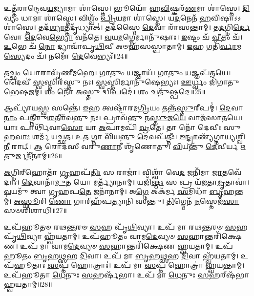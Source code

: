 𑌉𑌤𑍍𑌤᳴𑌰𑌾𑌨𑍍𑌦𑍇𑌵\-\ul{𑌯}\-𑌜𑍍𑌯𑌾𑌮𑌾 𑌶𑌾॑𑌸𑍍𑌤𑍇।
𑌭𑍂𑌯𑍋᳴ 𑌹\-\ul{𑌵𑌿}\-𑌷𑍍𑌕𑌰᳴\-\ul{𑌣}\-𑌮𑌾 𑌶𑌾॑𑌸𑍍𑌤𑍇।
\-\ul{𑌦𑌿}\-𑌵𑍍𑌯𑌂 𑌧𑌾𑌮𑌾 𑌶𑌾॑𑌸𑍍𑌤𑍇।
𑌵𑌿𑌶𑍍𑌵𑌂᳴ \ul{𑌪𑍍𑌰𑌿}\-𑌯𑌮𑌾 𑌶𑌾॑𑌸𑍍𑌤𑍇।
𑌯\-\ul{𑌦}\-𑌨𑍇𑌨᳴ \ul{𑌹}\-𑌵𑌿𑌷𑌾\-𑌽𑌽𑌶𑌾॑𑌸𑍍𑌤𑍇।
𑌤𑌦᳴\-\ul{𑌶𑍍𑌯𑌾}\-𑌤𑍍𑌤𑌦𑍃᳴𑌧𑍍𑌯𑌾𑌤𑍍।
𑌤𑌦᳴𑌸𑍍𑌮𑍈 \ul{𑌦𑍇}\-𑌵𑌾 𑌰𑌾᳴𑌸𑌨𑍍𑌤𑌾𑌮𑍍।
𑌤\-\ul{𑌦}\-𑌗𑍍𑌨𑌿\-\ul{𑌰𑍍𑌦𑍇}\-𑌵𑍋 \ul{𑌦𑍇}\-𑌵𑍇\-\ul{𑌭𑍍𑌯𑍋} 𑌵𑌨᳴𑌤𑍇।
\-\ul{𑌵}\-𑌯\-\ul{𑌮}\-𑌗𑍍𑌨𑍇𑌰𑍍𑌮𑌾𑌨𑍁᳴𑌷𑌾𑌃।
\-\ul{𑌇}\-𑌷𑍍𑌟𑌂 𑌚᳴ \ul{𑌵𑍀}\-𑌤𑌂 𑌚᳴।
\-\ul{𑌉}\-𑌭𑍇 𑌚᳴ \ul{𑌨𑍋} 𑌦𑍍𑌯𑌾𑌵𑌾᳴𑌪𑍃\-\ul{𑌥𑌿}\-𑌵𑍀 𑌅𑍞𑌹᳴𑌸𑌸𑍍𑌪𑌾𑌤𑌾𑌮𑍍।
\-\ul{𑌇}\-𑌹 𑌗𑌤𑌿᳴\-\ul{𑌰𑍍𑌵𑌾}\-𑌮\-\ul{𑌸𑍍𑌯𑍇}\-𑌦𑌂 𑌚᳴।
𑌨𑌮𑍋᳴ \ul{𑌦𑍇}\-𑌵𑍇𑌭𑍍𑌯𑌃᳴॥24॥\anuvakamend[\-\ul{𑌅}\-\-\ul{𑌭}\-\-\ul{𑌯𑌂} 𑌕𑍃𑌤𑌾᳴𑌵𑌕𑍃\-\ul{𑌤𑌾}\-𑌗𑍍𑌨𑌿\-\ul{𑌰𑌿}\-𑌦𑍞 \ul{𑌹}\-𑌵𑌿𑌰᳴𑌜𑍁𑌷𑌤 𑌮\-\ul{𑌹𑍇}\-𑌨𑍍𑌦𑍍𑌰 \ul{𑌇}\-𑌦𑍞 \ul{𑌹}\-𑌵𑌿𑌰᳴𑌜𑍁𑌷𑌤 𑌸𑌜𑌾𑌤𑌵\-\ul{𑌨}\-𑌸𑍍𑌯𑌾𑌮𑌾 𑌶𑌾॑𑌸𑍍𑌤𑍇 \ul{𑌵𑍀}\-𑌤𑌂 \ul{𑌚} 𑌤𑍍𑌰𑍀𑌣𑌿᳴ 𑌚]

𑌤\-\ul{𑌚𑍍𑌛𑌂} 𑌯𑍋𑌰𑌾𑌵𑍃᳴𑌣𑍀𑌮𑌹𑍇।
\-\ul{𑌗𑌾}\-𑌤𑍁𑌂 \ul{𑌯}\-𑌜𑍍𑌞𑌾𑌯᳴।
\-\ul{𑌗𑌾}\-𑌤𑍁𑌂 \ul{𑌯}\-𑌜𑍍𑌞𑌪᳴𑌤𑌯𑍇।
𑌦𑍈𑌵𑍀॑ \ul{𑌸𑍍𑌵}\-𑌸𑍍𑌤𑌿𑌰᳴𑌸𑍍𑌤𑍁 𑌨𑌃।
\-\ul{𑌸𑍍𑌵}\-𑌸𑍍𑌤𑌿𑌰𑍍𑌮𑌾𑌨𑍁᳴𑌷𑍇𑌭𑍍𑌯𑌃।
\-\ul{𑌊}\-𑌰𑍍𑌧𑍍𑌵𑌂 𑌜𑌿᳴𑌗𑌾𑌤𑍁 𑌭𑍇\-\ul{𑌷}\-𑌜𑌮𑍍।
𑌶𑌂 𑌨𑍋᳴ 𑌅𑌸𑍍𑌤𑍁 \ul{𑌦𑍍𑌵𑌿}\-𑌪𑌦𑍇॑।
𑌶𑌂 𑌚𑌤𑍁᳴𑌷𑍍𑌪𑌦𑍇॥25॥\anuvakamend[𑌤\-\ul{𑌚𑍍𑌛𑌂} 𑌯𑍋\-\ul{𑌰}\-𑌷𑍍𑌟𑍗]

𑌆𑌪𑍍𑌯𑌾᳴𑌯\-\ul{𑌸𑍍𑌵} 𑌸𑌨𑍍𑌤𑍇॑।
\-\ul{𑌇}\-𑌹 𑌤𑍍𑌵𑌷𑍍𑌟𑌾᳴𑌰𑌮\-\ul{𑌗𑍍𑌰𑌿}\-𑌯𑌂 𑌤𑌨𑍍𑌨᳴\-\ul{𑌸𑍍𑌤𑍁}\-𑌰𑍀𑌪𑌮𑍍॑।
\-\ul{𑌦𑍇}\-𑌵𑌾\-\ul{𑌨𑌾𑌂} 𑌪𑌤𑍍𑌨𑍀᳴𑌰𑍁\-\ul{𑌶}\-𑌤𑍀𑌰᳴𑌵𑌨𑍍𑌤𑍁 𑌨𑌃।
𑌪𑍍𑌰𑌾𑌵᳴𑌨𑍍𑌤𑍁 𑌨\-\ul{𑌸𑍍𑌤𑍁}\-𑌜\-\ul{𑌯𑍇} 𑌵𑌾𑌜᳴𑌸𑌾𑌤𑌯𑍇।
𑌯𑌾𑌃 𑌪𑌾𑌰𑍍𑌥𑌿᳴𑌵𑌾\-\ul{𑌸𑍋} 𑌯𑌾 \ul{𑌅}\-𑌪𑌾𑌮𑌪𑌿᳴ \ul{𑌵𑍍𑌰}\-𑌤𑍇।
𑌤𑌾 𑌨𑍋᳴ 𑌦𑍇𑌵𑍀𑌃 𑌸𑍁𑌹\-\ul{𑌵𑌾𑌃} 𑌶𑌰𑍍𑌮᳴ 𑌯𑌚𑍍𑌛𑌤।
\-\ul{𑌉}\-𑌤 𑌗𑍍𑌨𑌾 𑌵𑌿᳴𑌯𑌨𑍍𑌤𑍁 \ul{𑌦𑍇}\-𑌵𑌪᳴𑌤𑍍𑌨𑍀𑌃।
\-\ul{𑌇}\-\-\ul{𑌨𑍍𑌦𑍍𑌰𑌾}\-𑌣𑍍𑌯᳴𑌗𑍍𑌨𑌾\-\ul{𑌯𑍍𑌯}\-𑌶𑍍𑌵𑌿\-\ul{𑌨𑍀} 𑌰𑌾𑌟𑍍।
𑌆 𑌰𑍋𑌦᳴𑌸𑍀 𑌵𑌰𑍁\-\ul{𑌣𑌾}\-𑌨𑍀 𑌶𑍃᳴𑌣𑍋𑌤𑍁।
\-\ul{𑌵𑌿}\-𑌯𑌨𑍍𑌤𑍁᳴ \ul{𑌦𑍇}\-𑌵𑍀𑌰𑍍𑌯 \ul{𑌋}\-𑌤𑍁𑌰𑍍𑌜𑌨𑍀᳴𑌨𑌾𑌮𑍍॥26॥

\-\ul{𑌅}\-𑌗𑍍𑌨𑌿𑌰𑍍‌\mbox{}𑌹𑍋𑌤𑌾᳴ \ul{𑌗𑍃}\-𑌹𑌪᳴\-\ul{𑌤𑌿𑌃} 𑌸 𑌰𑌾𑌜𑌾॑।
𑌵𑌿𑌶𑍍𑌵𑌾᳴ 𑌵𑍇\-\ul{𑌦} 𑌜𑌨𑌿᳴𑌮𑌾 \ul{𑌜𑌾}\-𑌤𑌵𑍇᳴𑌦𑌾𑌃।
\-\ul{𑌦𑍇}\-𑌵𑌾𑌨𑌾᳴\-\ul{𑌮𑍁}\-𑌤 𑌯𑍋 𑌮𑌰𑍍𑌤𑍍𑌯𑌾᳴𑌨𑌾𑌮𑍍।
𑌯𑌜𑌿᳴\-\ul{𑌷𑍍𑌠𑌃} 𑌸 𑌪𑍍𑌰 𑌯᳴𑌜𑌤𑌾\-\ul{𑌮𑍃}\-𑌤𑌾𑌵𑌾॑।
\-\ul{𑌵}\-𑌯𑌮𑍁᳴ 𑌤𑍍𑌵𑌾 𑌗𑍃𑌹𑌪\-\ul{𑌤𑍇} 𑌜𑌨𑌾᳴𑌨𑌾𑌮𑍍।
𑌅\-\ul{𑌗𑍍𑌨𑍇} 𑌅𑌕᳴𑌰𑍍𑌮 \ul{𑌸}\-𑌮𑌿𑌧𑌾᳴ \ul{𑌬𑍃}\-𑌹𑌨𑍍𑌤𑌮𑍍॑।
\-\ul{𑌅}\-\-\ul{𑌸𑍍𑌥𑍂}\-𑌰𑌿 \ul{𑌣𑍋} 𑌗𑌾𑌰𑍍‌\mbox{}𑌹᳴𑌪𑌤𑍍𑌯𑌾𑌨𑌿 𑌸𑌨𑍍𑌤𑍁।
\-\ul{𑌤𑌿}\-𑌗𑍍𑌮𑍇𑌨᳴ \ul{𑌨}\-𑌸𑍍𑌤𑍇𑌜᳴\-\ul{𑌸𑌾} 𑌸𑍞𑌶𑌿᳴𑌶𑌾𑌧𑌿॥27॥\anuvakamend[𑌜𑌨𑍀᳴𑌨𑌾\-\ul{𑌮}\-𑌷𑍍𑌟𑍗 𑌚᳴]

𑌉𑌪᳴𑌹𑍂𑌤𑍞 𑌰𑌥\-\ul{𑌨𑍍𑌤}\-𑌰𑍞 \ul{𑌸}\-𑌹 𑌪𑍃᳴\-\ul{𑌥𑌿}\-𑌵𑍍𑌯𑌾।
𑌉𑌪᳴ 𑌮𑌾 𑌰𑌥\-\ul{𑌨𑍍𑌤}\-𑌰𑍞 \ul{𑌸}\-𑌹 𑌪𑍃᳴\-\ul{𑌥𑌿}\-𑌵𑍍𑌯𑌾 𑌹𑍍𑌵᳴𑌯𑌤𑌾𑌮𑍍।
𑌉𑌪᳴𑌹𑍂𑌤𑌂 𑌵𑌾𑌮\-\ul{𑌦𑍇}\-𑌵𑍍𑌯𑍞 \ul{𑌸}\-𑌹𑌾𑌨𑍍𑌤𑌰𑌿᳴𑌕𑍍𑌷𑍇𑌣।
𑌉𑌪᳴ 𑌮𑌾 𑌵𑌾𑌮\-\ul{𑌦𑍇}\-𑌵𑍍𑌯𑍞 \ul{𑌸}\-𑌹𑌾𑌨𑍍𑌤𑌰𑌿᳴𑌕𑍍𑌷𑍇𑌣 𑌹𑍍𑌵𑌯𑌤𑌾𑌮𑍍।
𑌉𑌪᳴𑌹𑍂𑌤𑌂 \ul{𑌬𑍃}\-𑌹\-\ul{𑌥𑍍𑌸}\-𑌹 \ul{𑌦𑌿}\-𑌵𑌾।
𑌉𑌪᳴ 𑌮𑌾 \ul{𑌬𑍃}\-𑌹\-\ul{𑌥𑍍𑌸}\-𑌹 \ul{𑌦𑌿}\-𑌵𑌾 𑌹𑍍𑌵᳴𑌯𑌤𑌾𑌮𑍍।
𑌉𑌪᳴𑌹𑍂𑌤𑌾𑌃 \ul{𑌸}\-𑌪𑍍𑌤 𑌹𑍋𑌤𑍍𑌰𑌾𑌃॑।
𑌉𑌪᳴ 𑌮𑌾 \ul{𑌸}\-𑌪𑍍𑌤 𑌹𑍋𑌤𑍍𑌰𑌾॑ 𑌹𑍍𑌵𑌯𑌨𑍍𑌤𑌾𑌮𑍍।
𑌉𑌪᳴𑌹𑍂𑌤𑌾 \ul{𑌧𑍇}\-𑌨𑍁𑌃 \ul{𑌸}\-𑌹𑌰𑍍\mbox{}𑌷᳴𑌭𑌾।
𑌉𑌪᳴ 𑌮𑌾 \ul{𑌧𑍇}\-𑌨𑍁𑌃 \ul{𑌸}\-𑌹𑌰𑍍‌\mbox{}𑌷᳴𑌭𑌾 𑌹𑍍𑌵𑌯𑌤𑌾𑌮𑍍॥28॥

